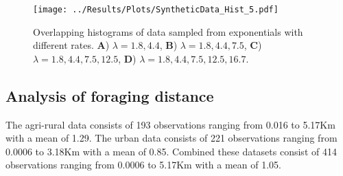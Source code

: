 \documentclass[11pt,usenames,dvipsnames]{article}
\begin{document}
\begin{figure}[H]
	\centering
	\texttt{[image: ../Results/Plots/SyntheticData\_Hist\_5.pdf]}
	\caption{Overlapping histograms of data sampled from exponentials with different rates. \textbf{A}) $\lambda = 1.8, 4.4$, \textbf{B}) $\lambda = 1.8, 4.4, 7.5$, \textbf{C}) $\lambda = 1.8, 4.4, 7.5, 12.5$, \textbf{D}) $\lambda = 1.8, 4.4, 7.5, 12.5, 16.7$.}
\end{figure}


\subsection{Analysis of foraging distance}

\begin{linenumbers}
\hspace{\parindent}
The agri-rural data consists of 193 observations ranging from 0.016 to 5.17Km with a mean of 1.29. The urban data consists of 221 observations ranging from 0.0006 to 3.18Km with a mean of 0.85. Combined these datasets consist of 414 observations ranging from 0.0006 to 5.17Km with a mean of 1.05.
\end{linenumbers}
\end{document}
